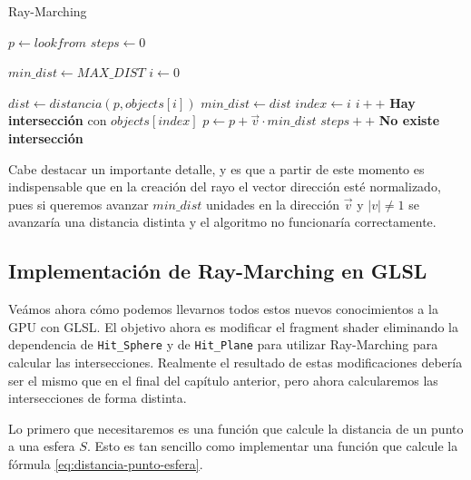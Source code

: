 \begin{algorithm}[H]
\caption{Ray-Marching} \label{alg:Ray-Marching}
\begin{algorithmic}
\State $p\gets lookfrom$
\State $steps \gets 0$

 
    \State $min\_dist \gets MAX\_DIST$
    \State $i\gets 0$

    
        \State $dist \gets distancia(p, objects[i])$
            \State $min\_dist \gets dist$
            \State $index\gets i$
        \EndIf
        \State $i++$
    \EndWhile
        \State \textbf{Hay intersección} con $objects[index]$
    \Else
        \State $p\gets p + \vec v \cdot min\_dist$ 
    \EndIf
    \State $steps++$
\EndWhile
\State \textbf{No existe intersección}
\end{algorithmic}
\end{algorithm}

\begin{observacion}
\label{observacion:vector-normalizado}
    Cabe destacar un importante detalle, y es que a partir de este momento es indispensable que en la creación del rayo el vector dirección esté normalizado, pues si queremos avanzar $min\_dist$ unidades en la dirección $\vec v$ y $|v| \not= 1$ se avanzaría una distancia distinta y el algoritmo no funcionaría correctamente.
\end{observacion}

\subsection{Implementación de Ray-Marching en GLSL}

Veámos ahora cómo podemos llevarnos todos estos nuevos conocimientos a la GPU con GLSL. El objetivo ahora es modificar el fragment shader eliminando la dependencia de \verb|Hit_Sphere| y de \verb|Hit_Plane| para utilizar Ray-Marching para calcular las intersecciones. Realmente el resultado de estas modificaciones debería ser el mismo que en el final del capítulo anterior, pero ahora calcularemos las intersecciones de forma distinta. 

Lo primero que necesitaremos es una función que calcule la distancia de un punto a una esfera $S$. Esto es tan sencillo como implementar una función que calcule la fórmula \ref{eq:distancia-punto-esfera}.

\begin{lstlisting}
    
\end{lstlisting}